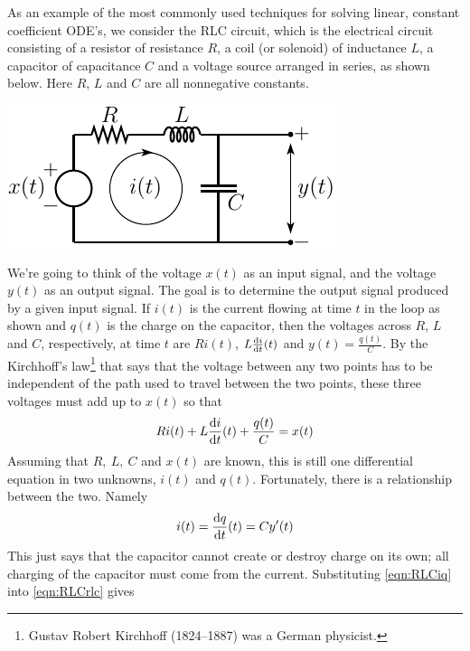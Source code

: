 \begin{eg}\label{eg:RLC}
As an example of the most commonly used techniques for solving linear,
constant coefficient ODE's, we consider the RLC circuit, which is
the electrical circuit consisting of a resistor of
resistance $R$, a coil (or solenoid) of inductance $L$, a capacitor 
of capacitance $C$ and a voltage source arranged in series, as shown below. 
Here $R$, $L$
and $C$ are all nonnegative constants.
\begin{efig}
\begin{center}
    \includegraphics[scale=1.3]{RLC.pdf}
\end{center}
\end{efig}
 We're going to think of the voltage $x(t)$ as an input signal,
and the voltage $y(t)$ as an output signal. 
The goal is to determine the output signal produced by a given input signal. 
If $i(t)$ is the current flowing at time $t$ in the loop as shown and 
$q(t)$ is the charge on the capacitor, then the voltages across $R$, $L$ 
and $C$, respectively, at time $t$ are
$Ri(t)$, $L\diff{i}{t}(t)$ and $y(t)=\frac{q(t)}{C}$. By the Kirchhoff's 
law\footnote{Gustav Robert Kirchhoff (1824--1887) was a German physicist.} 
that says that the voltage between any two points has to be independent 
of the path used to travel between the two points, these three voltages 
must add up to $x(t)$ so that
\begin{equation}\label{eqn:RLCrlc}
Ri(t) + L\diff{i}{t}(t) + \frac{q(t)}{C} = x(t)
\end{equation}
Assuming that $R,\ L,\ C$ and $x(t)$ are known, this is still one 
differential equation in two unknowns, $i(t)$ and $q(t)$. Fortunately,
there is a relationship between the two. Namely
\begin{equation}\label{eqn:RLCiq}
i(t)=\diff{q}{t}(t) = Cy'(t)
\end{equation}
This just says that the capacitor cannot create or destroy charge on 
its own; all charging of the capacitor must come from the current.  
Substituting \eqref{eqn:RLCiq} into \eqref{eqn:RLCrlc} gives
\begin{equation*}%

\end{equation*}
\end{eg}

